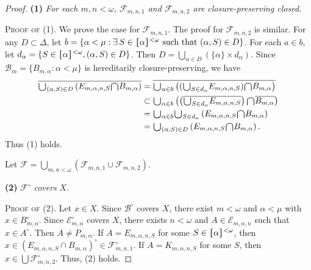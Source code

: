 \documentclass[jisng7iii.tex]{subfiles}
\begin{document}
\begin{proof}
\textbf{(1)} \textit{For each $m, n < \omega$, $\mathscr{F}_{m,n,1}$ and $\mathscr{F}_{m,n,2}$ are closure-preserving closed.}

\noindent\textsc{Proof of (1)}.
 We prove the case for $\mathscr{F}_{m,n,1}$. The proof for $\mathscr{F}_{m,n,2}$ is similar.
For any $D\subset \Delta$, let $b = \{\alpha < \mu: \exists \, S \in \hstretch{1.8}{[}\alpha\hstretch{1.8}{]}^{<\omega} \text { such that } (\alpha, S) \in D\}$.
For each $a\in b$, let $d_\alpha = \{S\in \hstretch{1.8}{[}\alpha\hstretch{1.8}{]}^{<\omega}, (\alpha, S)\in D\}$.
Then $D = \bigcup_{\alpha\in D}(\{\alpha\}\times d_\alpha)$.
Since $\mathscr{B}_m = \{B_{m,\alpha}: \alpha < \mu\}$ is hereditarily  closure-preserving, we have
\begin{equation*}
	\begin{aligned}
		\overline{\raisebox{-2pt}{\scalebox{1.5}{$\cup$}}_{(\alpha, S)\in D}
		\left(E_{m,\alpha,n,S}\raisebox{-2pt}{\scalebox{1.5}{$\cap$}} B_{m,\alpha}\right)} &= 
			\overline{\raisebox{-2pt}{\scalebox{1.5}{$\cup$}}_{\alpha\in b}
				\left(
			(\raisebox{-2pt}{\scalebox{1.5}{$\cup$}}_{S\in d_\alpha}E_{m,\alpha,n,S}) 
				\raisebox{-2pt}{\scalebox{1.5}{$\cap$}} B_{m,\alpha} \right)} \\
		&\subset 	\raisebox{-2pt}{\scalebox{1.5}{$\cup$}}_{\alpha\in b}\left(
			\left(\overline{\raisebox{-2pt}{\scalebox{1.5}{$\cup$}}_{S\in d_\alpha}E_{m,\alpha,n,S}}\right) 
			\raisebox{-2pt}{\scalebox{1.5}{$\cap$}} \overline{B_{m,\alpha}} \right)  \\
		&= \raisebox{-2pt}{\scalebox{1.5}{$\cup$}}_{\alpha\in b} \raisebox{-2pt}{\scalebox{1.5}{$\cup$}}_{S\in d_\alpha}\left(E_{m,\alpha,n,S}\raisebox{-2pt}{\scalebox{1.5}{$\cap$}} B_{m,\alpha} \right) \\
		&= \raisebox{-2pt}{\scalebox{1.5}{$\cup$}}_{(\alpha, S)\in D}\left(E_{m,\alpha,n,S}
		\raisebox{-2pt}{\scalebox{1.5}{$\cap$}} B_{m,\alpha} \right).
	\end{aligned}
\end{equation*}
Thus (1) holds.

 Let $\mathscr{F} = \bigcup_{m,n<\omega} (\mathscr{F}_{m,n,1} \cup \mathscr{F}_{m,n,2})$.

\textbf{(2)} $\mathscr{F}^\circ$ \textit{ covers } $X$.
 
 \noindent\textsc{Proof of (2)}.  Let $x \in X$. Since $\mathscr{B}^\circ$ covers $X$, there exist $m< \omega$ and 
 $\alpha<\mu$ with $x \in B_{m,\alpha}^\circ$.
Since $\mathscr{E}_{m,\alpha}^\circ$ covers $X$, there exists  $n < \omega$ 
and $A \in \mathscr{E}_{m,\alpha,n}$ such that $x \in A^\circ$. Then $A\ne P_{m, \alpha}$. 
 If $A = E_{m,\alpha,n,S}$ for some $S\in \hstretch{1.8}{[}\alpha\hstretch{1.8}{]}^{<\omega}$, then 
 $x \in (E_{m,\alpha,n,S} \cap B_{m,\alpha})^\circ \in \mathscr{F}_{m,n,1}^\circ$.
If $A = K_{m,\alpha,n,S}$ for some $S$, then $x \in\bigcup\mathscr{F}_{m,n,2}^\circ$.
Thus, (2) holds.


\end{proof}
\end{document}

